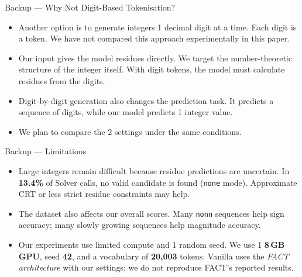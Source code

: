 \documentclass[aspectratio=169,10pt]{beamer}
\newcommand{\tightlist}{\setlength{\itemsep}{0.2em}}
\newcommand{\readout}[1]{\textcolor{readoutblue}{{\mdseries #1}}}
\begin{document}
\appendix



\begin{frame}{Backup --- Why Not Digit-Based Tokenisation?}
\begin{itemize}\tightlist
    \item \readout{Another option is to generate integers 1 decimal digit at a time.}
          Each digit is a token. \readout{We have not compared this approach experimentally in this paper.}
    \item \readout{Our input gives the model residues directly.}
          We target the \alert{number-theoretic structure of the integer itself}.
          With digit tokens, the model must calculate residues from the digits.
    \item \readout{Digit-by-digit generation also changes the prediction task.}
          It predicts a sequence of digits, while our model predicts 1 integer value.
    \item We plan to compare the 2 settings under the same conditions.
  \end{itemize}
\end{frame}

\begin{frame}{Backup --- Limitations}
\begin{itemize}\tightlist
    \item \readout{Large integers remain difficult because residue predictions are uncertain.}
          In \textbf{13.4\%} of Solver calls, no valid candidate is found (\texttt{none} mode).
          Approximate CRT or less strict residue constraints may help.
    \item \readout{The dataset also affects our overall scores.}
          Many \texttt{nonn} sequences help sign accuracy;
          many slowly growing sequences help magnitude accuracy.
    \item \readout{Our experiments use limited compute and 1 random seed.}
          We use 1 \textbf{8\,GB GPU}, seed \textbf{42}, and a vocabulary of \textbf{20{,}003} tokens.
          Vanilla uses the \emph{FACT architecture} with our settings;
          we do not reproduce FACT's reported results.
  \end{itemize}
\end{frame}
\end{document}

